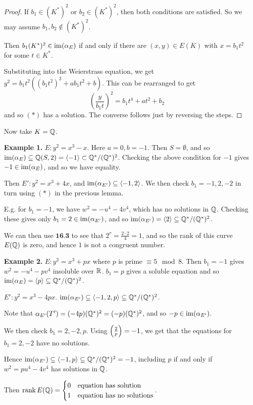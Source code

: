 \documentclass[10pt,a4paper]{article}
\begin{document}
\begin{proof}
  If $b_1 \in (K^\ast)^2$ or $b_2 \in (K^\ast)^2$, then both conditions are satisfied. So we may assume $b_1, b_2 \notin (K^\ast)^2$.

  Then $b_1(K^\ast)^2 \in \operatorname{im}(\alpha_E)$ if and only if there are $(x,y) \in E(K)$ with $x = b_1t^2$ for some $t \in K^\ast$.

  Substituting into the Weierstrass equation, we get $y^2 = b_1t^2((b_1t^2)^2 + ab_1t^2 + b)$. This can be rearranged to get
  \[\left(\frac{y}{b_1t}\right)^2 = b_1t^4 + at^2 + b_2\]
  and so $(\ast)$ has a solution. The converse follows just by reversing the steps.
\end{proof}
Now take $K = \mathbb{Q}$.

\textbf{Example 1.} $E: y^2 = x^3-x$. Here $a = 0, b = -1$. Then $S = \emptyset$, and so $\operatorname{im}(\alpha_E) \subseteq \mathbb{Q}(S,2) = \langle -1 \rangle \subset \mathbb{Q}^\ast/(\mathbb{Q}^\ast)^2$. Checking the above condition for $-1$ gives $-1 \in \operatorname{im}(\alpha_E)$, and so we have equality.

Then $E': y^2 = x^3+4x$, and $\operatorname{im}(\alpha_{E'}) \subseteq \langle -1,2 \rangle$. We then check $b_1 = -1, 2, -2$ in turn using $(\ast)$ in the previous lemma.

E.g. for $b_1 = -1$, we have $w^2 = -u^4-4v^4$, which has no solutions in $\mathbb{Q}$. Checking these gives only $b_1 = 2 \in \operatorname{im}(\alpha_{E'})$, and so $\operatorname{im}(\alpha_{E'}) = \langle 2 \rangle \subseteq \mathbb{Q}^\ast/(\mathbb{Q}^\ast)^2$.

We can then use $\textbf{16.3}$ to see that $2^r = \frac{2\cdot 2}{4} = 1$, and so the rank of this curve $E(\mathbb{Q})$ is zero, and hence $1$ is not a congruent number.

\textbf{Example 2.} $E: y^2 = x^3 + px$ where $p$ is prime $\equiv 5 \mod 8$. Then $b_1 = -1$ gives $w^2 = -u^4-pv^4$ insoluble over $\mathbb{R}$. $b_1 = p$ gives a soluble equation and so $\operatorname{im}(\alpha_E) = \langle p \rangle \subseteq \mathbb{Q}^\ast/(\mathbb{Q}^\ast)^2$.

$E': y^2 = x^3-4px$. $\operatorname{im}(\alpha_{E'}) \subseteq \langle -1,2,p \rangle\subseteq \mathbb{Q}^\ast/(\mathbb{Q}^\ast)^2$.

Note that $\alpha_{E'}(T') = (-4p)(\mathbb{Q}^\ast)^2 = (-p)(\mathbb{Q}^\ast)^2$, and so $-p \in \operatorname{im}(\alpha_{E'})$.

We then check $b_1 = 2, -2, p$. Using $\left(\frac{2}{p}\right) = -1$, we get that the equations for $b_1 = 2, -2$ have no solutions.

Hence $\operatorname{im}(\alpha_{E'}) \subseteq \langle -1,p \rangle\subseteq \mathbb{Q}^\ast/(\mathbb{Q}^\ast)^2 = -1$, including $p$ if and only if $w^2 = pu^4-4v^4$ has solutions in $\mathbb{Q}$.

Then $\operatorname{rank} E(\mathbb{Q}) = \begin{cases} 0 & \text{equation has solution} \\ 1 & \text{equation has no solutions} \end{cases}$.
\end{document}
